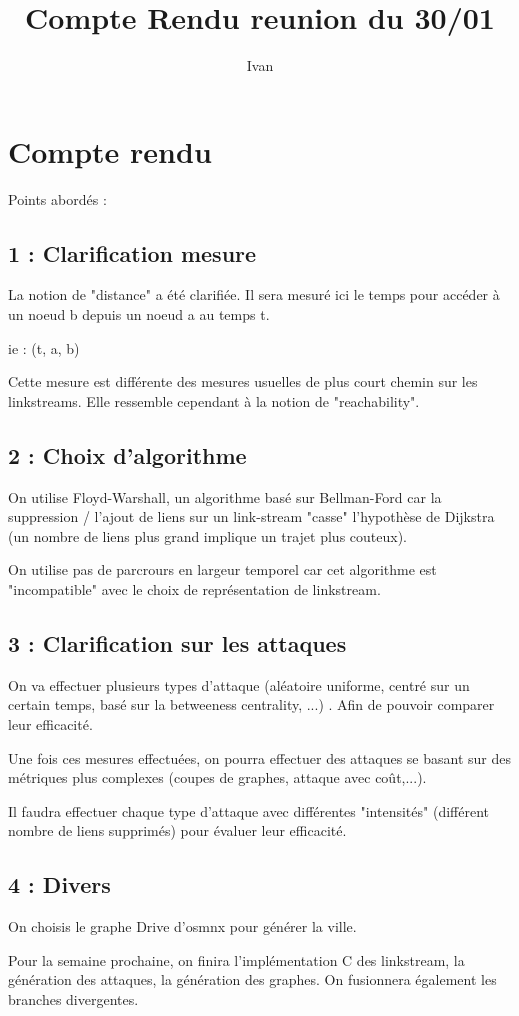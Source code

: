 \documentclass[12pt]{article}
\title{Compte Rendu reunion du 30/01}
\author{Ivan}
\begin{document}
\maketitle

\section{Compte rendu}

Points abordés : 

\subsection{1 : Clarification mesure}
La notion de "distance" a été clarifiée. Il sera 
mesuré ici le temps pour accéder à un noeud b depuis 
un noeud a au temps t. 

ie : (t, a, b)

Cette mesure est différente des mesures usuelles de 
plus court chemin sur les linkstreams. Elle ressemble 
cependant à la notion de "reachability". 

 

\subsection{2 : Choix d'algorithme}

On utilise Floyd-Warshall, un algorithme basé sur 
Bellman-Ford car la suppression / l'ajout de liens sur 
un link-stream "casse" l'hypothèse de Dijkstra (un nombre 
de liens plus grand implique un trajet plus couteux). 

On utilise pas de parcrours en largeur temporel car cet
algorithme est "incompatible" avec le choix de représentation 
de linkstream. 


\subsection{3 : Clarification sur les attaques} 

On va effectuer plusieurs types d'attaque (aléatoire uniforme, 
centré sur un certain temps, basé sur la betweeness centrality, 
...) . Afin de pouvoir comparer leur efficacité.

Une fois ces mesures effectuées, on pourra effectuer des 
attaques se basant sur des métriques plus complexes (coupes 
de graphes, attaque avec coût,...). 

Il faudra effectuer chaque type d'attaque avec 
différentes "intensités" (différent nombre de liens supprimés) 
pour évaluer leur efficacité.

\subsection{4 : Divers } 

On choisis le graphe Drive d'osmnx pour générer la ville. 

Pour la semaine prochaine, on finira l'implémentation C des 
linkstream, la génération des attaques, la génération des 
graphes. On fusionnera également les branches divergentes.   
\end{document}

